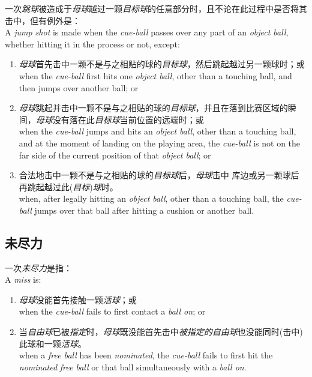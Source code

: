 \noindent 一次\emph{跳球}被造成于\emph{母球}越过一颗\emph{目标球}的任意部分时，且不论在此过程中是否将其击中，但有例外是：\\
A \emph{jump shot} is made when the \emph{cue-ball} passes over any part of an \emph{object ball}, whether hitting it in the process or not, except:
\begin{enumerate}[label=(\alph*)]
    \item \emph{母球}首先击中一颗不是与之相贴的球的\emph{目标球}，然后跳起越过另一颗球时；或\\
    when the \emph{cue-ball} first hits one \emph{object ball}, other than a touching ball, and then jumps over another ball; or
    \item \emph{母球}跳起并击中一颗不是与之相贴的球的\emph{目标球}，并且在落到比赛区域的瞬间，\emph{母球}没有落在此\emph{目标球}当前位置的远端时；或\\
    when the \emph{cue-ball} jumps and hits an \emph{object ball}, other than a touching ball, and at the moment of landing on the playing area, the \emph{cue-ball} is not on the far side of the current position of that \emph{object ball}; or
    \item 合法地击中一颗不是与之相贴的球的\emph{目标球}后，\emph{母球}击中
    库边或另一颗球后再跳起越过此(\emph{目标})\emph{球}时。\\
    when, after legally hitting an \emph{object ball}, other than a touching ball, the \emph{cue-ball} jumps over that ball after hitting a cushion or another ball.
\end{enumerate}

\subsection{未尽力}

\noindent 一次\emph{未尽力}是指：\\
A \emph{miss} is:
\begin{enumerate}[label=(\alph*)]
    \item \emph{母球}没能首先接触一颗\emph{活球}；或\\
    when the \emph{cue-ball} fails to first contact a \emph{ball on}; or
    \item 当\emph{自由球}已被\emph{指定}时，\emph{母球}既没能首先击中\emph{被指定的}\emph{自由球}也没能同时(击中)此球和一颗\emph{活球}。\\
    when a \emph{free ball} has been \emph{nominated}, the \emph{cue-ball} fails to first hit the \emph{nominated} \emph{free ball} or that ball simultaneously with a \emph{ball on}.
\end{enumerate}


